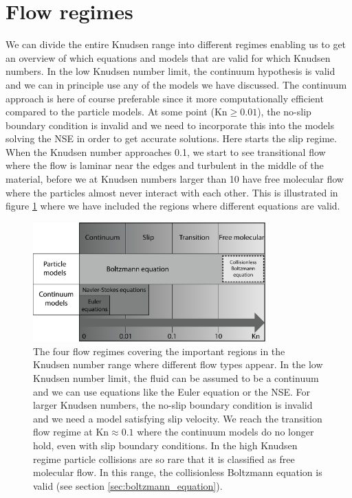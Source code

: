 \section{Flow regimes}
We can divide the entire Knudsen range into different regimes enabling us to get an overview of which equations and models that are valid for which Knudsen numbers. In the low Knudsen number limit, the continuum hypothesis is valid and we can in principle use any of the models we have discussed. The continuum approach is here of course preferable since it more computationally efficient compared to the particle models. At some point (Kn$\geq 0.01$), the no-slip boundary condition is invalid and we need to incorporate this into the models solving the NSE in order to get accurate solutions. Here starts the slip regime. When the Knudsen number approaches 0.1, we start to see transitional flow where the flow is laminar near the edges and turbulent in the middle of the material, before we at Knudsen numbers larger than 10 have free molecular flow where the particles almost never interact with each other. This is illustrated in figure \ref{fig:flow_regimes} where we have included the regions where different equations are valid.
\begin{figure}[h!]
\begin{center}
\includegraphics[width=0.8\textwidth, trim=0cm 0cm 0cm 0cm, clip]{figures/flowregimes.eps}
\end{center}
\caption{The four flow regimes covering the important regions in the Knudsen number range where different flow types appear. In the low Knudsen number limit, the fluid can be assumed to be a continuum and we can use equations like the Euler equation or the NSE. For larger Knudsen numbers, the no-slip boundary condition is invalid and we need a model satisfying slip velocity. We reach the transition flow regime at Kn$\approx 0.1$ where the continuum models do no longer hold, even with slip boundary conditions. In the high Knudsen regime particle collisions are so rare that it is classified as free molecular flow. In this range, the collisionless Boltzmann equation is valid (see section \ref{sec:boltzmann_equation}).}
\label{fig:flow_regimes}
\end{figure}
